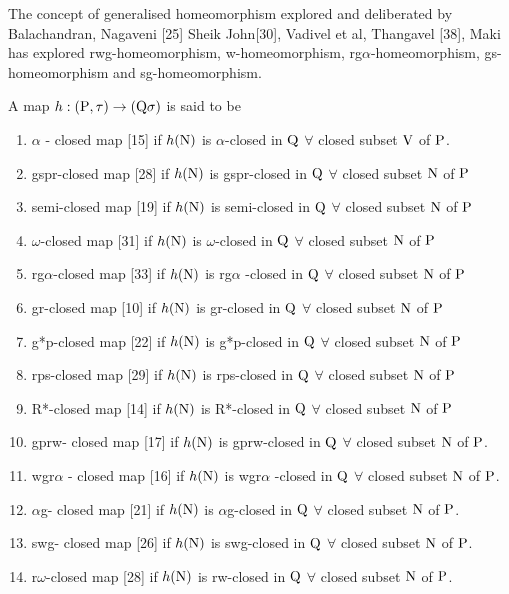 The concept of generalised homeomorphism explored and deliberated by Balachandran, Nagaveni [25] Sheik John[30], Vadivel et al, Thangavel [38], Maki has explored rwg-homeomorphism, w-homeomorphism, rg$\alpha$-homeomorphism, gs-homeo\-mor\-phism  and sg-homeomorphism.

\begin{dfn}\label{dfn1.4.1}
A map $h: (\mathrm{P}, \tau) \rightarrow (\mathrm{Q} \sigma)$ is said to be 
\begin{enumerate}
\item $\alpha$ - closed map [15] if $h(\mathrm{N})$ is $\alpha$-closed in $\mathrm{Q}$  $\forall$ closed subset $\mathrm{V}$ of $\mathrm{P}$. 
\item gspr-closed map [28] if $h(\mathrm{N})$ is gspr-closed in $\mathrm{Q}$  $\forall$ closed subset $\mathrm{N}$ of $\mathrm{P}$ 
\item semi-closed map [19] if $h(\mathrm{N})$ is semi-closed in $\mathrm{Q}$  $\forall$ closed subset $\mathrm{N}$ of $\mathrm{P}$ 
\item $\omega$-closed map [31] if $h(\mathrm{N})$ is $\omega$-closed in $\mathrm{Q}$  $\forall$ closed subset $\mathrm{N}$ of $\mathrm{P}$
\item rg$\alpha$-closed map [33] if  $h(\mathrm{N})$ is rg$\alpha$ -closed in $\mathrm{Q}$  $\forall$ closed subset $\mathrm{N}$ of $\mathrm{P}$ 
\item gr-closed map [10] if $h(\mathrm{N})$ is gr-closed in $\mathrm{Q}$  $\forall$ closed subset $\mathrm{N}$ of $\mathrm{P}$ 
\item g*p-closed map [22] if $h(\mathrm{N})$ is g*p-closed in $\mathrm{Q}$  $\forall$ closed subset $\mathrm{N}$ of $\mathrm{P}$ 
\item rps-closed map [29] if $h(\mathrm{N})$ is rps-closed in $\mathrm{Q}$  $\forall$ closed subset $\mathrm{N}$ of $\mathrm{P}$ 
\item R*-closed map [14] if $h(\mathrm{N})$ is R*-closed in $\mathrm{Q}$  $\forall$  closed subset $\mathrm{N}$ of $\mathrm{P}$ 
\item  gprw- closed map [17] if $h(\mathrm{N})$ is gprw-closed in $\mathrm{Q}$  $\forall$  closed subset $\mathrm{N}$ of $\mathrm{P}$.  
\item  wgr$\alpha$ - closed map [16] if $h(\mathrm{N})$ is wgr$\alpha$ -closed in $\mathrm{Q}$  $\forall$  closed subset $\mathrm{N}$ of $\mathrm{P}$. 
\item  $\alpha$g- closed map [21] if $h(\mathrm{N})$ is $\alpha$g-closed in $\mathrm{Q}$  $\forall$   closed subset $\mathrm{N}$ of $\mathrm{P}$. 
\item  swg- closed map [26] if $h(\mathrm{N})$ is swg-closed in $\mathrm{Q}$  $\forall$  closed subset $\mathrm{N}$ of $\mathrm{P}$.  
\item  r$\omega$-closed map [28] if $h(\mathrm{N})$ is rw-closed in $\mathrm{Q}$  $\forall$   closed subset $\mathrm{N}$ of $\mathrm{P}$.  

\end{enumerate}
\end{dfn}
